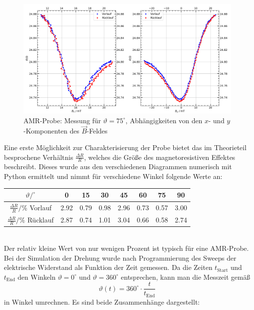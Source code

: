 \documentclass[german,  %
parskip=full,  %
]{scrartcl}
\begin{document}
\begin{figure}[h!]\centering
\includegraphics[width=\textwidth]{Probe1_75_Grad.png}
\caption{AMR-Probe: Messung für \(\vartheta=75^{\circ}\), Abhängigkeiten von den \(x\)- und \(y\)-Komponenten des \(\vec{B}\)-Feldes}
\end{figure}
\newpage  
Eine erste Möglichkeit zur Charakterisierung der Probe bietet das im Theorieteil besprochene Verhältnis \(\frac{\Delta R}{R}\), welches die Größe des magnetoresistiven Effektes beschreibt. Dieses wurde aus den verschiedenen Diagrammen numerisch mit Python ermittelt und nimmt für verschiedene Winkel folgende Werte an: \\
\begin{table}[h!]\centering
\begin{tabular}{|c|c|c|c|c|c|c|c|}
\hline
\(\vartheta / ^{\circ}\)  & 0 & 15 & 30 & 45 & 60 & 75 & 90 \\\hline
\(\frac{\Delta R}{R} / \%\) Vorlauf & 2.92 & 0.79 & 0.98 & 2.96 & 0.73 & 0.57 & 3.00 \\\hline
\(\frac{\Delta R}{R} / \%\) Rücklauf & 2.87 & 0.74 & 1.01 & 3.04 & 0.66 & 0.58 & 2.74 \\\hline
\end{tabular}
\end{table} \\
Der relativ kleine Wert von nur wenigen Prozent ist typisch für eine AMR-Probe.
Bei der Simulation der Drehung wurde nach Programmierung des Sweeps der elektrische Widerstand als Funktion der Zeit gemessen. Da die Zeiten \(t_{\mathrm{Start}}\) und \(t_{\mathrm{End}}\) den Winkeln \(\vartheta = 0^{\circ}\) und \(\vartheta = 360^{\circ}\) entsprechen, kann man die Messzeit gemäß 
\[\vartheta(t) = 360^{\circ} \cdot \frac{t}{t_{\mathrm{End}}}\]
in Winkel umrechnen. Es sind beide Zusammenhänge dargestellt: \\\\
\end{document}

